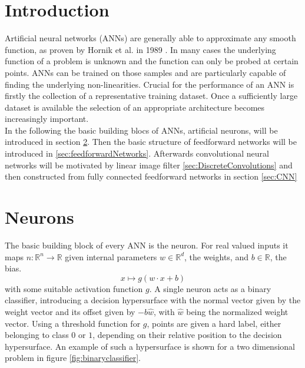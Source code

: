 
\section{Introduction}

Artificial neural networks (ANNs) are generally able to approximate any smooth function, as proven by Hornik et al. in 1989 \cite{Hornik1989}. In many cases the underlying function of a problem is unknown and the function can only be probed at certain points. ANNs can be trained on those samples and are particularly capable of finding the underlying non-linearities. Crucial for the performance of an ANN is firstly the collection of a representative training dataset. Once a sufficiently large dataset is available the selection of an appropriate architecture becomes increasingly important. \\

In the following the basic building blocs of ANNs, artificial neurons, will be introduced in section \ref{sec:Neurons}. Then the basic structure of feedforward networks will be introduced in \ref{sec:feedforwardNetworks}. Afterwards convolutional neural networks will be motivated by linear image filter \ref{sec:DiscreteConvolutions} and then constructed from fully connected feedforward networks in section \ref{sec:CNN}


\section{Neurons}
\label{sec:Neurons}
The basic building block of every ANN is the neuron. For real valued inputs it maps $n: \mathbb{R}^n \rightarrow \mathbb{R}$ given internal parameters $w \in \mathbb{R}^d$, the weights, and $b \in \mathbb{R}$, the bias.
\begin{equation}
x \mapsto g(w \cdot x + b)
\end{equation}
with some suitable activation function $g$. A single neuron acts as a binary classifier, introducing a decision hypersurface with the normal vector given by the weight vector and its offset given by $-b \hat{w}$, with $\hat{w}$ being the normalized weight vector. Using a threshold function for $g$, points are given a hard label, either belonging to class $0$ or $1$, depending on their relative position to the decision hypersurface. An example of such a hypersurface is shown for a two dimensional problem in figure \ref{fig:binaryclassifier}. \\

